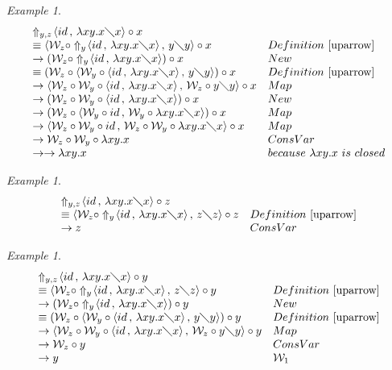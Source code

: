 \documentclass[11pt]{amsart}
\theoremstyle{plain}
\theoremstyle{definition}
\theoremstyle{remark}
\newtheorem{example}[theorem]{Example}
\numberwithin{equation}{section}
\newcommand{\ci}{\circ}
\newcommand{\mi}{\,,\,}
\newcommand{\is}{\diagdown}
\newcommand{\arrow}{\rightarrow}
\newcommand{\la}{\langle}
\newcommand{\ra}{\rangle}
\newcommand{\twoh}{\arrow\arrow}
\renewcommand{\pi}{\mathcal{W}}
\begin{document}
\begin{example}\label{4.25}
$$\begin{array}{ll}
\Uparrow_{y,z}\!\la id\mi \lambda xy.x\is x\ra\ci x & \\
\equiv\la\pi_z\ci\Uparrow_y\!\la id\mi \lambda xy.x\is x\ra\mi
y\is y\ra\ci x &
Definition~\ref{uparrow}\\
\arrow(\pi_z\ci\Uparrow_y\! \la id\mi \lambda xy.x\is x\ra)\ci x &
New\\
\equiv(\pi_z\ci\la\pi_y\ci \la id\mi \lambda xy.x\is x\ra\mi y\is
y\ra)\ci x &
Definition~\ref{uparrow}\\
\arrow\la\pi_z\ci\pi_y\ci\la id\mi \lambda xy.x\is x\ra\mi
\pi_z\ci y\is y\ra\ci x
& Map\\
\arrow(\pi_z\ci\pi_y\ci\la id\mi \lambda xy.x\is x\ra)\ci x &
New\\
\arrow(\pi_z\ci\la\pi_y\ci id\mi \pi_y\ci\lambda xy.x\is x\ra)\ci
x & Map\\
\arrow\la\pi_z\ci\pi_y\ci id\mi\pi_z\ci\pi_y\ci\lambda xy.x\is
x\ra\ci x & Map\\
\arrow\pi_z\ci\pi_y\ci\lambda xy.x & ConsVar\\
\twoh \lambda x y.x & because\,\, \lambda xy.x\,\, is\,\, closed
\end{array}$$
\end{example}
\begin{example}\label{4.26}
$$\begin{array}{ll}
\Uparrow_{y,z}\!\la id\mi \lambda xy.x\is x\ra\ci z & \\
\equiv\la\pi_z\ci \Uparrow_y\!\la id\mi \lambda xy.x\is x\ra\mi z\is z\ra\ci z & Definition~\ref{uparrow}\\
\arrow z & ConsVar
\end{array}$$
\end{example}
\begin{example}\label{4.27}
$$\begin{array}{ll}
\Uparrow_{y,z}\!\la id\mi\lambda xy.x\is x\ra\ci y & \\
\equiv\la\pi_z\ci\Uparrow_y\!\la id\mi \lambda xy.x\is x\ra\mi
z\is
z\ra\ci y & Definition~\ref{uparrow}\\
\arrow(\pi_z\ci\Uparrow_y\!\la id\mi \lambda xy.x\is x\ra)\ci y &
New\\
\equiv(\pi_z\ci\la\pi_y\ci\la id\mi\lambda xy.x\is x\ra\mi y\is
y\ra)\ci y & Definition~\ref{uparrow}\\
\arrow\la\pi_z\ci\pi_y\ci\la id\mi \lambda xy.x\is x\ra\mi
\pi_z\ci
y\is y\ra\ci y & Map\\
\arrow \pi_z\ci y & ConsVar\\
\arrow y & \pi_1
\end{array}$$
\end{example}
\end{document}
